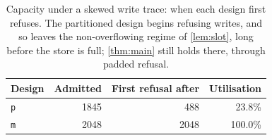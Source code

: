 \begin{table}[t]
\centering
\caption{Capacity under a skewed write trace: when each design first refuses. The partitioned
design begins refusing writes, and so leaves the non-overflowing regime of \cref{lem:slot}, long
before the store is full; \cref{thm:main} still holds there, through padded refusal.}
\label{tab:e9cap}
\small
\setlength{\tabcolsep}{4pt}
\begin{tabular}{lrrr}
\toprule
Design & Admitted & First refusal after & Utilisation \\
\midrule
\texttt{p} & 1845 & 488 & 23.8\% \\
\texttt{m} & 2048 & 2048 & 100.0\% \\
\bottomrule
\end{tabular}
\end{table}
